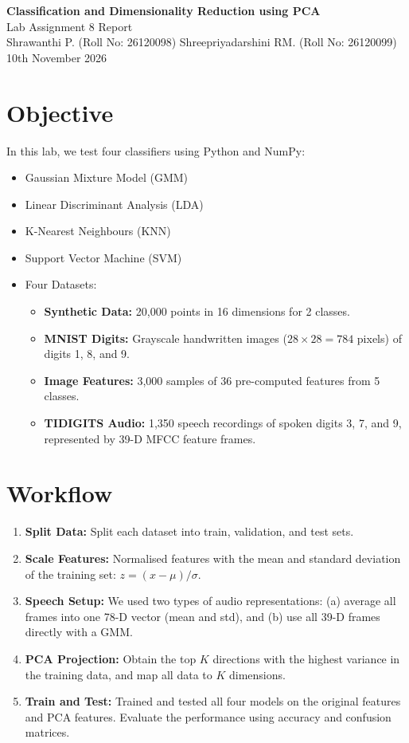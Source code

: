 \documentclass[11pt,a4paper]{article}
\begin{document}
\begin{center}
{\LARGE \textbf{Classification and Dimensionality Reduction using PCA}}\\[6pt]
{\large Lab Assignment 8 Report}\\[6pt]
Shrawanthi P. (Roll No: 26120098) \quad Shreepriyadarshini RM. (Roll No: 26120099)\\[4pt]
10th November 2026
\end{center}

\section{Objective}
In this lab, we test four classifiers using Python and NumPy:
\begin{itemize}
  \item Gaussian Mixture Model (GMM)
  \item Linear Discriminant Analysis (LDA)
  \item K-Nearest Neighbours (KNN)
  \item Support Vector Machine (SVM)
  \item Four Datasets:
  \begin{itemize}
    \item \textbf{Synthetic Data:} 20,000 points in 16 dimensions for 2 classes.
    \item \textbf{MNIST Digits:} Grayscale handwritten images ($28 \times 28 = 784$ pixels) of digits 1, 8, and 9.
    \item \textbf{Image Features:} 3,000 samples of 36 pre-computed features from 5 classes.
    \item \textbf{TIDIGITS Audio:} 1,350 speech recordings of spoken digits 3, 7, and 9, represented by 39-D MFCC feature frames.
  \end{itemize}
\end{itemize}

\section{Workflow}
\begin{enumerate}
  \item \textbf{Split Data:} Split each dataset into train, validation, and test sets.
  \item \textbf{Scale Features:} Normalised features with the mean and standard deviation of the training set: $z = (x - \mu)/\sigma$.
  \item \textbf{Speech Setup:} We used two types of audio representations: (a) average all frames into one 78-D vector (mean and std), and (b) use all 39-D frames directly with a GMM.
  \item \textbf{PCA Projection:} Obtain the top $K$ directions with the highest variance in the training data, and map all data to $K$ dimensions.
  \item \textbf{Train and Test:} Trained and tested all four models on the original features and PCA features. Evaluate the performance using accuracy and confusion matrices.
\end{enumerate}
\end{document}
